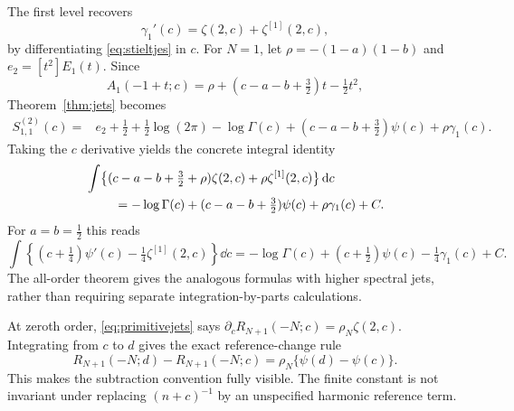 The first level recovers
\begin{equation}\label{eq:stieltjesderivative}
 \gamma_1'(c)=\zeta(2,c)+\zeta^{[1]}(2,c),
\end{equation}
by differentiating \eqref{eq:stieltjes} in $c$.
For $N=1$, let $\rho=-(1-a)(1-b)$ and
$e_2=[t^2]E_1(t)$.  Since
\[
 A_1(-1+t;c)=\rho+(c-a-b+\tfrac32)t-\tfrac12t^2,
\]
Theorem~\ref{thm:jets} becomes
\begin{align}
 S_{1,1}^{(2)}(c)={}&e_2+\frac12+\frac12\log(2\pi)
 -\log\Gamma(c)+(c-a-b+\tfrac32)\psi(c)+\rho\gamma_1(c).
 \label{eq:firstprimitiveclosed}
\end{align}
Taking the $c$ derivative yields the concrete integral identity
\begin{align}
 &\int\bigl\{(c-a-b+\tfrac32+\rho)\zeta(2,c)
                  +\rho\zeta^{[1]}(2,c)\bigr\}\,\mathrm d c\notag\\
 &\hspace{8mm}=-\log\Gamma(c)+(c-a-b+\tfrac32)\psi(c)
                   +\rho\gamma_1(c)+C.
 \label{eq:explicitprimitive}
\end{align}
For $a=b=\tfrac12$ this reads
\begin{equation}\label{eq:halfprimitive}
 \int\left\{(c+\tfrac14)\psi'(c)-\tfrac14\zeta^{[1]}(2,c)\right\}\dd c
 =-\log\Gamma(c)+(c+\tfrac12)\psi(c)-\tfrac14\gamma_1(c)+C.
\end{equation}
The all-order theorem gives the analogous formulas with higher spectral
jets, rather than requiring separate integration-by-parts calculations.

At zeroth order, \eqref{eq:primitivejets} says
$\partial_c R_{N+1}(-N;c)=\rho_N\zeta(2,c)$.
Integrating from $c$ to $d$ gives the exact reference-change rule
\begin{equation}\label{eq:resreference}
 R_{N+1}(-N;d)-R_{N+1}(-N;c)=\rho_N\{\psi(d)-\psi(c)\}.
\end{equation}
This makes the subtraction convention fully visible.  The finite constant
is not invariant under replacing $(n+c)^{-1}$ by an unspecified harmonic
reference term.
